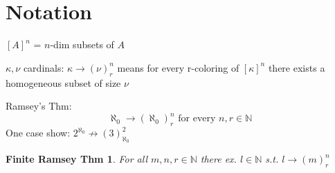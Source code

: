 \documentclass[12pt]{article}
\newcommand{\Nat}{\ensuremath{\mathbb{N}}}
\begin{document}
\section{Notation}

$[A]^n$ = $n$-dim subsets of $A$

$\kappa, \nu$ cardinals:
$\kappa \rightarrow (\nu)^n_r$ means
for every r-coloring of $[\kappa]^n$ there exists a homogeneous subset of size $\nu$

Ramsey's Thm:
\[
\aleph_0 \rightarrow (\aleph_0)^n_r \text{ for every $n, r \in \Nat$}
\]
One case show:
$2^{\aleph_0} \not \rightarrow (3)^2_{\aleph_0}$

\newtheorem*{finiteram}{Finite Ramsey Thm}
\begin{finiteram}
  For all $m, n, r \in \Nat$ there ex. $l \in \Nat$ s.t. $l \rightarrow (m)^n_r$ 
\end{finiteram}
\end{document}
